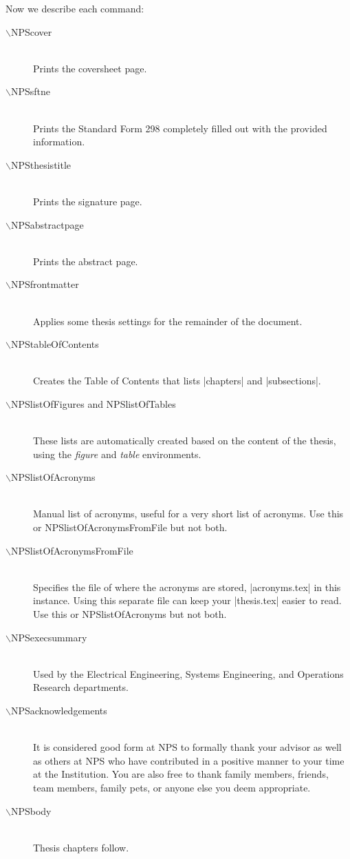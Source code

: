 Now we describe each command:

\begin{description}
  \item[$\backslash$NPScover] \hfill \\
  Prints the coversheet page.
  \item[$\backslash$NPSsftne] \hfill \\
  Prints the Standard Form 298 completely filled out with the provided information.
  \item[$\backslash$NPSthesistitle] \hfill \\
  Prints the signature page.
  \item[$\backslash$NPSabstractpage] \hfill \\
  Prints the abstract page.
  \item[$\backslash$NPSfrontmatter] \hfill \\
  Applies some thesis settings for the remainder of the document.
  \item[$\backslash$NPStableOfContents] \hfill \\
  Creates the Table of Contents that lists |chapters| and |subsections|.
  \item[$\backslash$NPSlistOfFigures and NPSlistOfTables] \hfill \\
  These lists are automatically created based on the content of the thesis, using the \emph{figure} and \emph{table}
  environments.  
  \item[$\backslash$NPSlistOfAcronyms] \hfill \\
  Manual list of acronyms, useful for a very short list of acronyms. 
  Use this or NPSlistOfAcronymsFromFile but not both.
  \item[$\backslash$NPSlistOfAcronymsFromFile] \hfill \\
  Specifies the file of where the acronyms are stored, |acronyms.tex| in 
  this instance.  Using this separate file can keep your |thesis.tex| 
  easier to read.  Use this or NPSlistOfAcronyms but not both.
  \item[$\backslash$NPSexecsummary] \hfill \\
  Used by the Electrical Engineering, Systems Engineering, and Operations 
  Research departments.
  \item[$\backslash$NPSacknowledgements] \hfill \\
  It is considered good form at NPS to formally thank your advisor as
  well as others at NPS who have contributed in a positive manner to
  your time at the Institution. You are also free to thank family
  members, friends, team members, family pets, or anyone else you deem
  appropriate.
  \item[$\backslash$NPSbody] \hfill \\
  Thesis chapters follow.  
\end{description}

